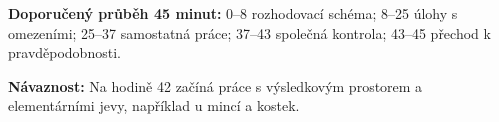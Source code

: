 \documentclass[11pt,a4paper]{article}
\begin{document}
\textbf{Doporučený průběh 45 minut:} 0–8 rozhodovací schéma; 8–25 úlohy s omezeními; 25–37 samostatná práce; 37–43 společná kontrola; 43–45 přechod k pravděpodobnosti.\par
\textbf{Návaznost:} Na hodině 42 začíná práce s výsledkovým prostorem a elementárními jevy, například u mincí a kostek.\par
\vspace{2mm}\par
\end{document}
